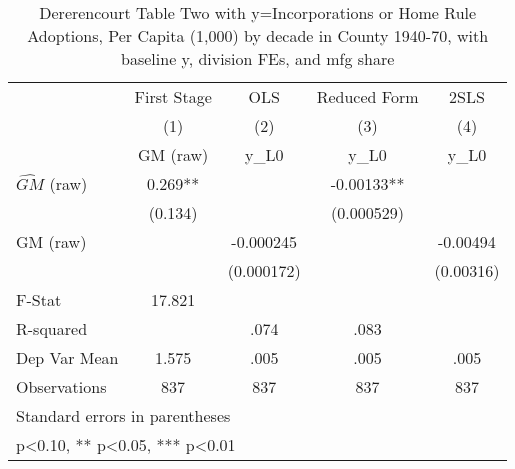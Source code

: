 \begin{table}[htbp]\centering
\def\sym#1{\ifmmode^{#1}\else\(^{#1}\)\fi}
\caption{Dererencourt Table Two with y=Incorporations or Home Rule Adoptions, Per Capita (1,000) by decade in County 1940-70, with baseline y, division FEs, and mfg share}
\begin{tabular}{l*{4}{c}}
\toprule
                    & First Stage   &         OLS   &Reduced Form   &        2SLS   \\
                    &\multicolumn{1}{c}{(1)}&\multicolumn{1}{c}{(2)}&\multicolumn{1}{c}{(3)}&\multicolumn{1}{c}{(4)}\\
                    &\multicolumn{1}{c}{GM  (raw)}&\multicolumn{1}{c}{y\_L0}&\multicolumn{1}{c}{y\_L0}&\multicolumn{1}{c}{y\_L0}\\
\midrule
$\hat{GM}$ (raw)    &       0.269** &               &    -0.00133** &               \\
                    &     (0.134)   &               &  (0.000529)   &               \\
\addlinespace
GM  (raw)           &               &   -0.000245   &               &    -0.00494   \\
                    &               &  (0.000172)   &               &   (0.00316)   \\
\midrule
F-Stat              &      17.821   &               &               &               \\
R-squared           &               &        .074   &        .083   &               \\
Dep Var Mean        &       1.575   &        .005   &        .005   &        .005   \\
Observations        &         837   &         837   &         837   &         837   \\
\bottomrule
\multicolumn{5}{l}{\footnotesize Standard errors in parentheses}\\
\multicolumn{5}{l}{\footnotesize * p<0.10, ** p<0.05, *** p<0.01}\\
\end{tabular}
\end{table}
